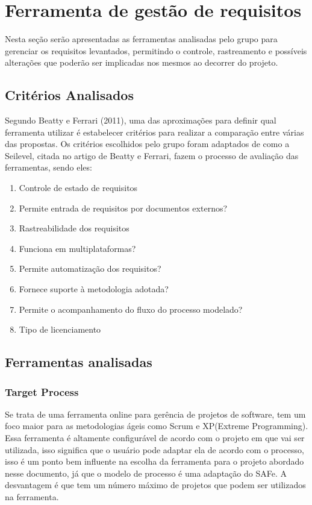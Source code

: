 \chapter{Ferramenta de gestão de requisitos}

Nesta seção serão apresentadas as ferramentas analisadas pelo grupo para gerenciar os requisitos levantados, permitindo o controle, rastreamento e possíveis alterações que poderão ser implicadas nos mesmos ao decorrer do projeto.

\section{Critérios Analisados}
	Segundo Beatty e Ferrari (2011), uma das aproximações para definir qual ferramenta utilizar é estabelecer critérios para realizar a comparação entre várias das propostas.
	Os critérios escolhidos pelo grupo foram adaptados de como a Seilevel, citada no artigo de Beatty e Ferrari, fazem o processo de avaliação das ferramentas, sendo eles:
	\begin{enumerate}
	\item Controle de estado de requisitos
	\item Permite entrada de requisitos por documentos externos?
	\item Rastreabilidade dos requisitos
	\item Funciona em multiplataformas?
	\item Permite automatização dos requisitos?
	\item Fornece suporte à metodologia adotada?
	\item Permite o acompanhamento do fluxo do processo modelado?
	\item Tipo de licenciamento
	\end{enumerate}
\section{Ferramentas analisadas}

\subsection{Target Process}
Se trata de uma ferramenta online para gerência de projetos de software, tem um foco maior para as metodologias ágeis como Scrum e XP(Extreme Programming). Essa ferramenta é altamente configurável de acordo com o projeto em que vai ser utilizada, isso significa que o usuário pode adaptar ela de acordo com o processo, isso é um ponto bem influente na escolha da ferramenta para o projeto abordado nesse documento, já que o modelo de processo é uma adaptação do SAFe. A desvantagem é que tem um número máximo de projetos que podem ser utilizados na ferramenta.

